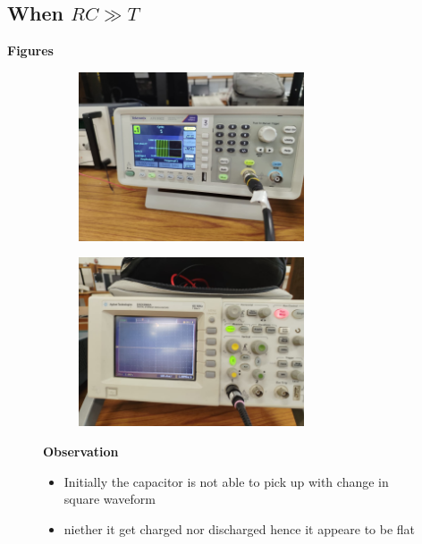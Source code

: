 \documentclass[a4paper,12pt]{article}
\begin{document}
\subsection{When $RC\gg T$}
\begin{itemize}
    \item \textbf{Figures}
    \begin{figure}[H]
    \centering
    \begin{subfigure}{0.48\textwidth}
        \centering
        \includegraphics[height=5cm]{figs/transinputrc>>t.jpeg}
    \end{subfigure}
    \hspace{0.04\textwidth} %
    \begin{subfigure}{0.48\textwidth}
        \centering
        \includegraphics[height=5cm]{figs/transoutputrc>>t.jpeg}
    \end{subfigure}
    \item \textbf{Observation}
    \begin{itemize}
        \item Initially the capacitor is not able to pick up with change in square waveform  
        \item niether it get charged nor discharged hence it appeare to be flat
    \end{itemize}
\end{figure}
\end{itemize}
\end{document}

